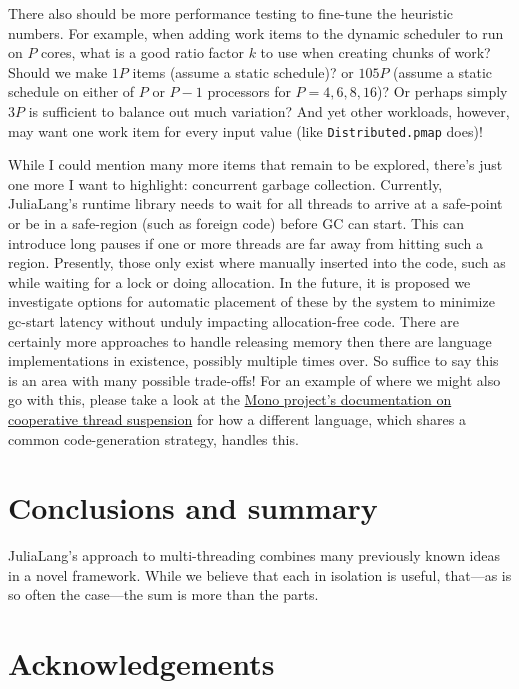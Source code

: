 \documentclass{juliacon}
\begin{document}
There also should be more performance testing to fine-tune the heuristic numbers. For example, when adding work items to the dynamic scheduler to run on $P$ cores, what is a good ratio factor $k$ to use when creating chunks of work? Should we make $1P$ items (assume a static schedule)? or $105P$ (assume a static schedule on either of $P$ or $P-1$ processors for $P=4,6,8,16$)? Or perhaps simply $3P$ is sufficient to balance out much variation? And yet other workloads, however, may want one work item for every input value (like \verb|Distributed.pmap| does)!

While I could mention many more items that remain to be explored, there's just one more I want to highlight: concurrent garbage collection. Currently, JuliaLang's runtime library needs to wait for all threads to arrive at a safe-point or be in a safe-region (such as foreign code) before GC can start. This can introduce long pauses if one or more threads are far away from hitting such a region. Presently, those only exist where manually inserted into the code, such as while waiting for a lock or doing allocation. In the future, it is proposed we investigate options for automatic placement of these by the system to minimize gc-start latency without unduly impacting allocation-free code. There are certainly more approaches to handle releasing memory then there are language implementations in existence, possibly multiple times over. So suffice to say this is an area with many possible trade-offs! For an example of where we might also go with this, please take a look at the \href{https://www.mono-project.com/docs/advanced/runtime/docs/coop-suspend/}{Mono project's documentation on cooperative thread suspension}\cite{mono-coop-suspend} for how a different language, which shares a common code-generation strategy, handles this.

\section{Conclusions and summary}
\label{subsub:conclusion}

JuliaLang's approach to multi-threading combines many previously known ideas in a novel framework. While we believe that each in isolation is useful, that—as is so often the case—the sum is more than the parts.

\section{Acknowledgements}
\label{subsub:acknowledgements}
\end{document}
